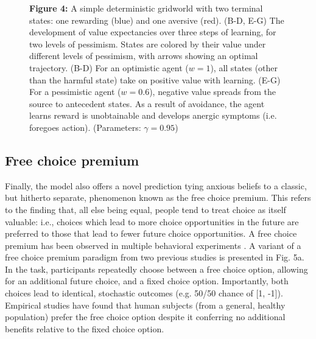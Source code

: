 \documentclass[11pt]{article} %
\begin{document}
\begin{figure}[!b]
  \centerline{%
  }
  \par \textbf{Figure 4:} A simple deterministic gridworld with two terminal states: one rewarding (blue) and one aversive (red). (B-D, E-G) The development of value expectancies over three steps of learning, for two levels of pessimism.
  States are colored by their value under different levels of pessimism, with arrows showing an optimal trajectory. (B-D) For an optimistic agent ($w=1$), all states (other than the harmful state) take on positive value with learning. (E-G) For a pessimistic agent ($w=0.6$), negative value spreads from the source to antecedent states. As a result of avoidance, the agent learns reward is unobtainable and develops anergic symptoms (i.e. foregoes action). (Parameters: $\gamma = 0.95$)
\end{figure}

\subsection{Free choice premium}

Finally, the model also offers a novel prediction tying anxious beliefs to a classic, but hitherto separate, phenomenon known as the free choice premium. This refers to the finding that, all else being equal, people tend to treat choice as itself valuable: i.e., choices which lead to more choice opportunities in the future are preferred to those that lead to fewer future choice opportunities. A free choice premium has been observed in multiple behavioral experiments \cite{Leotti2010, ly2019}. A variant of a free choice premium paradigm from two previous studies\cite{Leotti2011,Leotti2014} is presented in Fig. 5a. In the task, participants repeatedly choose between a free choice option, allowing for an additional future choice, and a fixed choice option. Importantly, both choices lead to identical, stochastic outcomes (e.g. 50/50 chance of [1, -1]). Empirical studies have found that human subjects (from a general, healthy population) prefer the free choice option despite it conferring no additional benefits relative to the fixed choice option. 
\end{document}
